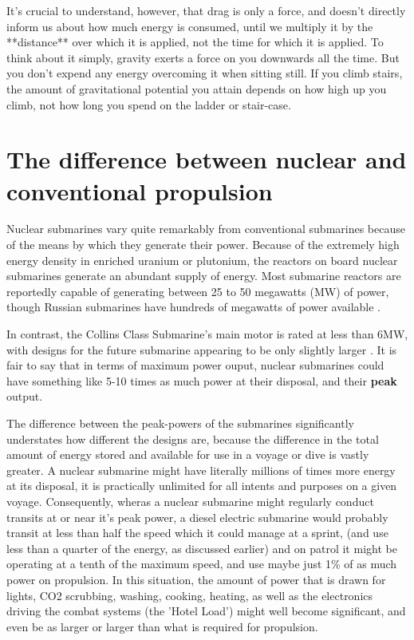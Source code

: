 \documentclass{article}\usepackage[]{graphicx}\usepackage[]{color}
\begin{document}
It's crucial to understand, however, that drag is only a force, and doesn't directly inform us about how much energy is consumed, until we multiply it by the **distance** over which it is applied, not the time for which it is applied.  To think about it simply, gravity exerts a force on you downwards all the time.  But you don't expend any energy overcoming it when sitting still.  If you climb stairs, the amount of gravitational potential you attain depends on how high up you climb, not how long you spend on the ladder or stair-case.




\section{The difference between nuclear and conventional propulsion}

Nuclear submarines vary quite remarkably from conventional submarines because of the means by which they generate their power.  Because of the extremely high energy density in enriched uranium or plutonium, the reactors on board nuclear submarines generate an abundant supply of energy.  Most submarine reactors are reportedly capable of generating between 25 to 50 megawatts (MW) of power, though Russian submarines have hundreds of megawatts of power available \parencite{WNA2017}.

In contrast, the Collins Class Submarine's main motor is rated at less than 6MW, with designs for the future submarine appearing to be only slightly larger \parencite{patrick2012}.  It is fair to say that in terms of maximum power ouput, nuclear submarines could have something like 5-10 times as much power at their disposal, and their \textbf{peak} output.  

The difference between the peak-powers of the submarines significantly understates how different the designs are, because the difference in the total amount of energy stored and available for use in a voyage or dive is vastly greater.  A nuclear submarine might have literally millions of times more energy at its disposal, it is practically unlimited for all intents and purposes on a given voyage. Consequently, wheras a nuclear submarine might regularly conduct transits at or near it's peak power, a diesel electric submarine would probably transit at less than half the speed which it could manage at a sprint, (and use less than a quarter of the energy, as discussed earlier) and on patrol it might be operating at a tenth of the maximum speed, and use maybe just 1\% of as much power on propulsion. In this situation, the amount of power that is drawn for lights, CO2 scrubbing, washing, cooking, heating, as well as the electronics driving the combat systems (the 'Hotel Load') might well become significant, and even be as larger or larger than what is required for propulsion.
\end{document}
